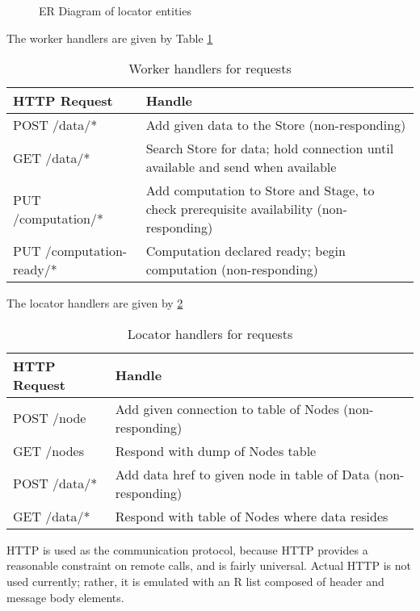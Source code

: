\begin{figure}

\caption{ER Diagram of locator entities}
\label{fig:locatordb}
\end{figure}

The worker handlers are given by Table \ref{tbl:whandler}

\begin{table}[]
\caption{Worker handlers for requests}
\label{tbl:whandler}
\begin{tabular}{@{}ll@{}}
\toprule
HTTP Request             & Handle                                                                         \\ \midrule
POST /data/*             & Add given data to the Store (non-responding)                                   \\
GET /data/*              & Search Store for data; hold connection until available and send when available \\
PUT /computation/* & Add computation to Store and Stage, to check prerequisite availability (non-responding) \\
PUT /computation-ready/* & Computation declared ready; begin computation (non-responding)                 \\ \bottomrule
\end{tabular}
\end{table}

The locator handlers are given by \ref{tbl:lhandler}

\begin{table}[]
\caption{Locator handlers for requests}
\label{tbl:lhandler}
\begin{tabular}{@{}ll@{}}
\toprule
HTTP Request & Handle                                                        \\ \midrule
POST /node   & Add given connection to table of Nodes (non-responding)       \\
GET /nodes   & Respond with dump of Nodes table                              \\
POST /data/* & Add data href to given node in table of Data (non-responding) \\
GET /data/*  & Respond with table of Nodes where data resides                \\ \bottomrule
\end{tabular}
\end{table}

HTTP is used as the communication protocol, because HTTP provides a reasonable constraint on remote calls, and is fairly universal.
Actual HTTP is not used currently; rather, it is emulated with an R list composed of header and message body elements.

